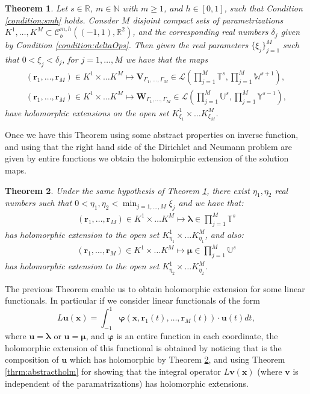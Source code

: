 \documentclass{article}
\newtheorem{theorem}{Theorem}[section]
\newcommand{\bmu} {\bm{\mu}}
\newcommand{\IN}{{\mathbb N}}
\newcommand{\IR}{{\mathbb R}}
\newcommand{\IU}{{\mathbb U}}
\newcommand{\IT}{{\mathbb T}}
\newcommand{\IW}{{\mathbb W}}
\newcommand{\IY}{{\mathbb Y}}
\newcommand{\rgeoh}[2]{\mathcal{C}_b^{#1,#2}\left( (-1,1), \IR^2 \right)}
\newcommand{\bla}{\boldsymbol \lambda}
\newcommand{\bu}{\bm{u}}
\newcommand{\bv}{\bm{v}}
\newcommand{\br}{\bm{r}}
\newcommand{\bx}{\bm{x}}
\begin{document}
\begin{theorem}
\label{thrm:biohlmextension}
Let $s \in \IR$, $m \in \IN$ with $m \geq 1$, and $h \in [0,1]$, such that Condition \ref{condition:smh} holds. Consder $M$ disjoint compact sets of parametrizations $K^1,\hdots,K^M \subset \rgeoh{m}{h}$, and the corresponding real numbers $\delta_j$ given by Condition  \ref{condition:deltaOps}. Then given the real parameters $\{\xi_j\}_{j=1}^M$ such that $0 < \xi_j < \delta_j$, for $j=1,\hdots,M$ we have that the maps 
\begin{align*}
(\br_1,\hdots,\br_M) \in K^1 \times \hdots K^M \mapsto \mathbf{V}_{\Gamma_1, \hdots,\Gamma_M} \in \mathcal{L} \left(  \prod_{j=1}^M \IT^s, \prod_{j=1}^M \IW^{s+1}
\right)
,\\
(\br_1,\hdots,\br_M) \in K^1 \times \hdots K^M \mapsto \mathbf{W}_{\Gamma_1, \hdots,\Gamma_M} \in \mathcal{L} \left(  \prod_{j=1}^M \IU^s, \prod_{j=1}^M \IY^{s-1}
\right)
,
\end{align*}
have holomorphic extensions on the open set $K^1_{\xi_1}\times\hdots K^M_{\xi_M}$.
\end{theorem}
Once we have this Theorem using some abstract properties on inverse function, and using that the right hand side of the Dirichlet and Neumann problem are given by entire functions we obtain the holomirphic extension of the solution maps. 
\begin{theorem}
\label{thrm:solutionholomrext}
Under the same hypothesis of Theorem \ref{thrm:biohlmextension}, there exist $\eta_1,\eta_2$ real numbers such that
$0<\eta_1,\eta_2< \min_{j=1,\hdots,M}\xi_j$ and we have that: 
\begin{align*}
(\br_1,\hdots,\br_M) \in K^1 \times \hdots K^M \mapsto  \bla \in \prod_{j=1}^M \IT^s
\end{align*}
has holomorphic extension to the open set $K_{\eta_1}^1 \times \hdots K_{\eta_1}^M$, and also: 
\begin{align*}
(\br_1,\hdots,\br_M) \in K^1 \times \hdots K^M \mapsto  \bmu \in \prod_{j=1}^M \IU^s
\end{align*}
has holomorphic extension to the open set $K_{\eta_2}^1 \times \hdots K_{\eta_2}^M$.
\end{theorem}
The previous Theorem enable us to obtain holomorphic extension for some linear functionals. In particular if we consider linear functionals of the form  $$L\bu (\bx) = \int_{-1}^{1} \mathbf{\varphi}(\bx,\br_1(t),\hdots,\br_M(t)) \cdot \bu(t) dt,$$ where $\bu = \bla $ or $\bu = \bmu$, and $\mathbf{\varphi}$ is an entire function in each coordinate, the holomorphic extension of this functional is obtained by noticing that is the composition of $\bu$ which has holomorphic by Theorem \ref{thrm:solutionholomrext}, and using Theorem \ref{thrm:abstractholm} for showing that the integral operator 
$L\bv(\bx)$ (where $\bv$ is independent of the paramatrizations) has holomorphic extensions. 
\end{document}
